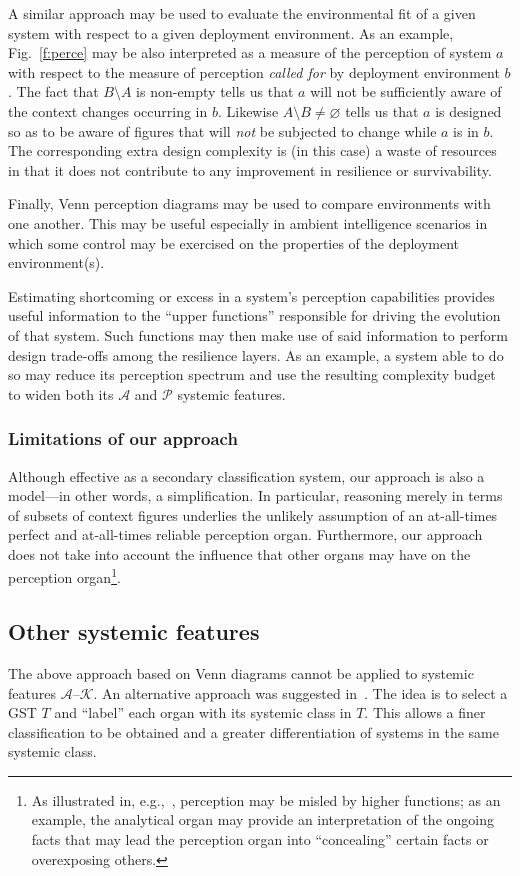 \documentclass[twocolumn]{svjour3}
\def\A{\hbox{$\mathcal{A}$}}
\def\P{\hbox{$\mathcal{P}$}}
\def\K{\hbox{$\mathcal{K}$}}
\begin{document}
A similar approach may be 
used to evaluate the environmental fit
of a given system with respect to a given deployment environment.
As an example, Fig.~\ref{f:perce} may be also interpreted as a measure of the
perception of system $a$ with respect to the measure of perception
\emph{called for\/} by deployment environment $b$. The fact that $B\setminus A$ is non-empty
tells us that $a$ will not be sufficiently aware
of the context changes occurring in $b$. Likewise $A\setminus B\neq\varnothing$ tells us that $a$ is designed
so as to be aware of figures that will \emph{not\/} be subjected to change while $a$ is in $b$.
The corresponding extra design complexity is (in this case)
a waste of resources in that it does not contribute to any improvement in resilience or survivability.

Finally, Venn perception diagrams may be used to compare environments with one another. This may be
useful especially in ambient intelligence scenarios in which some control may be exercised on
the properties of the deployment environment(s).

Estimating shortcoming or excess in a system's perception capabilities provides useful
information to the ``upper functions'' responsible for driving the evolution of that system. Such functions
may then make use of said information to perform design trade-offs among the resilience layers.
As an example,
a system able to do so may reduce its perception spectrum and use the resulting complexity budget to widen both
its \A{} and \P{} systemic features.

\subsubsection{Limitations of our approach}
Although effective as a secondary classification system, our
approach is also a model---in other words,
a simplification. In particular, reasoning merely in terms of subsets of context figures
underlies the unlikely assumption of an at-all-times perfect and at-all-times reliable
perception organ.
Furthermore, our approach does not take
into account the influence that other organs may have on the perception organ\footnote{As
	illustrated in, e.g.,~\cite{BrGr15}, 
	perception may be misled by higher functions; as an example, the analytical organ
	may provide an interpretation of the ongoing facts that may lead the perception
	organ into ``concealing'' certain facts or overexposing others.}.

\subsection{Other systemic features}\label{s:osf}
The above approach based on Venn diagrams cannot be applied to systemic features \A--\K.
An alternative approach was suggested in~\cite{DF13b}. The idea is to select
a GST $T$ and
``label'' each organ with its systemic class in $T$.
This allows a finer classification to be obtained and a greater differentiation
of systems in the same systemic class.
\end{document}
